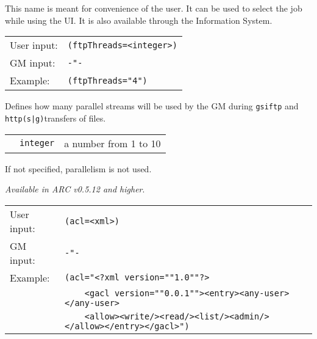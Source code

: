   This name is meant for convenience of the user. It can be used to
  select the job while using the UI. It is also available through the
  Information System.

  \hspace*{0.5cm}
  \begin{shaded}
  \end{shaded}
  \begin{tabular}{lp{13cm}}
    User input:&\verb#(ftpThreads=<integer>)#\\
    GM input:&\verb#-"-#\\
    Example:&\verb#(ftpThreads="4")#\\
  \end{tabular}

  Defines how many parallel streams will be used by the GM during
  \texttt{gsiftp} and \texttt{http(s|g)}transfers of files.

  \begin{tabular}{llp{10cm}}
    \hspace*{1cm}&\texttt{integer} & a number from 1 to 10\\
  \end{tabular}

  If not specified, parallelism is not used.

  \hspace*{0.5cm}
  \begin{shaded}
  \end{shaded}

  \textit{Available in ARC v0.5.12 and higher}.

  \begin{tabular}{lp{13cm}}
    User input:&\verb#(acl=<xml>)#\\
    GM input:&\verb#-"-#\\
    Example:&\verb#(acl="<?xml version=""1.0""?>#\\
    &\verb#    <gacl version=""0.0.1""><entry><any-user></any-user>#\\
    &\verb#    <allow><write/><read/><list/><admin/></allow></entry></gacl>")#\\
  \end{tabular}



